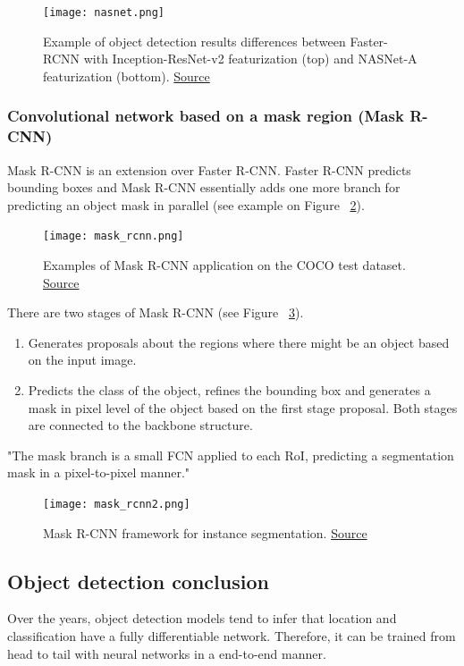 \begin{figure}[H]
    \centering
    \texttt{[image: nasnet.png]}
	\caption[NASNet]{Example of object detection results differences between Faster-RCNN
    with Inception-ResNet-v2 featurization (top) and NASNet-A featurization (bottom). \href{https://arxiv.org/pdf/1707.07012.pdf}{Source}}
    \label{fig:nasnet}
\end{figure}

\pagebreak\subsubsection{Convolutional network based on a mask region (Mask R-CNN)}
Mask R-CNN\cite{maskrcnn} is an extension over Faster R-CNN. Faster R-CNN predicts bounding boxes and Mask R-CNN essentially adds one more branch for predicting an object mask in parallel (see example on Figure ~\ref{fig:maskrcnn}).

\begin{figure}[H]
    \centering
    \texttt{[image: mask\_rcnn.png]}
	\caption[Mask R-CNN2]{Examples of Mask R-CNN application on the COCO test dataset.  \href{https://arxiv.org/pdf/1703.06870.pdf}{Source}}
	\label{fig:maskrcnn}
\end{figure}

There are two stages of Mask R-CNN (see Figure ~\ref{fig:maskrcnn2}). 
\begin{enumerate}
    \item Generates proposals about the regions where there might be an object based on the input image.
    \item Predicts the class of the object, refines the bounding box and generates a mask in pixel level of the object based on the first stage proposal. Both stages are connected to the backbone structure.
\end{enumerate}

\begin{it}
"The mask branch is a small FCN applied to each RoI, predicting a segmentation mask in a pixel-to-pixel manner."\cite{maskrcnn}
\end{it}

\begin{figure}[H]
    \centering
    \texttt{[image: mask\_rcnn2.png]}
	\caption[Mask R-CNN2]{Mask R-CNN framework for instance segmentation. \href{https://arxiv.org/pdf/1703.06870.pdf}{Source}}
	\label{fig:maskrcnn2}
\end{figure}

\pagebreak\subsection{Object detection conclusion}
Over the years, object detection models tend to infer that location and classification have a fully differentiable network. Therefore, it can be trained from head to tail with neural networks in a end-to-end manner.

